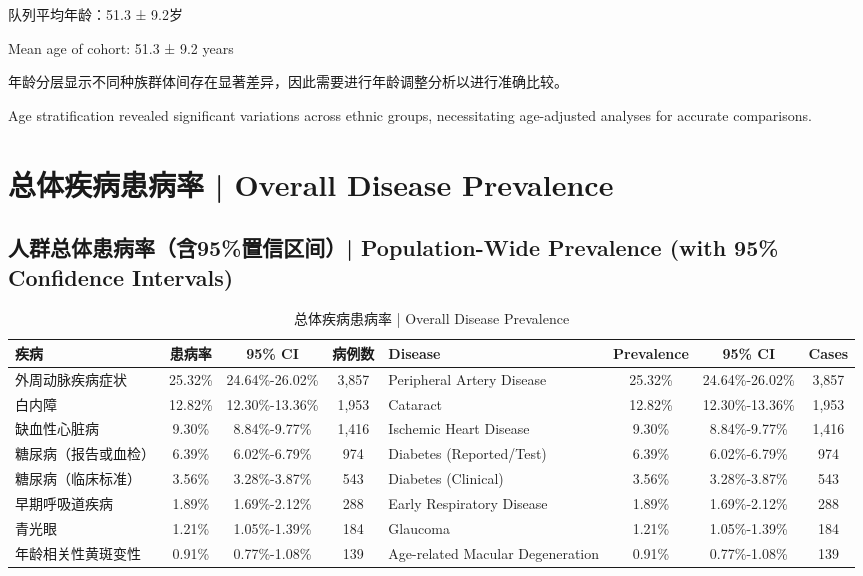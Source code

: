 \documentclass[12pt,a4paper]{article}
\begin{document}
队列平均年龄：51.3 ± 9.2岁

Mean age of cohort: 51.3 ± 9.2 years

年龄分层显示不同种族群体间存在显著差异，因此需要进行年龄调整分析以进行准确比较。

Age stratification revealed significant variations across ethnic groups, necessitating age-adjusted analyses for accurate comparisons.

\section{总体疾病患病率 | Overall Disease Prevalence}

\subsection{人群总体患病率（含95\%置信区间）| Population-Wide Prevalence (with 95\% Confidence Intervals)}

\begin{table}[H]
\centering
\caption{总体疾病患病率 | Overall Disease Prevalence}
\begin{tabular}{@{}lccclccc@{}}
\toprule
\textbf{疾病} & \textbf{患病率} & \textbf{95\% CI} & \textbf{病例数} & \textbf{Disease} & \textbf{Prevalence} & \textbf{95\% CI} & \textbf{Cases} \\
\midrule
外周动脉疾病症状 & 25.32\% & 24.64\%-26.02\% & 3,857 & Peripheral Artery Disease & 25.32\% & 24.64\%-26.02\% & 3,857 \\
白内障 & 12.82\% & 12.30\%-13.36\% & 1,953 & Cataract & 12.82\% & 12.30\%-13.36\% & 1,953 \\
缺血性心脏病 & 9.30\% & 8.84\%-9.77\% & 1,416 & Ischemic Heart Disease & 9.30\% & 8.84\%-9.77\% & 1,416 \\
糖尿病（报告或血检） & 6.39\% & 6.02\%-6.79\% & 974 & Diabetes (Reported/Test) & 6.39\% & 6.02\%-6.79\% & 974 \\
糖尿病（临床标准） & 3.56\% & 3.28\%-3.87\% & 543 & Diabetes (Clinical) & 3.56\% & 3.28\%-3.87\% & 543 \\
早期呼吸道疾病 & 1.89\% & 1.69\%-2.12\% & 288 & Early Respiratory Disease & 1.89\% & 1.69\%-2.12\% & 288 \\
青光眼 & 1.21\% & 1.05\%-1.39\% & 184 & Glaucoma & 1.21\% & 1.05\%-1.39\% & 184 \\
年龄相关性黄斑变性 & 0.91\% & 0.77\%-1.08\% & 139 & Age-related Macular Degeneration & 0.91\% & 0.77\%-1.08\% & 139 \\
\bottomrule
\end{tabular}
\end{table}
\end{document}
